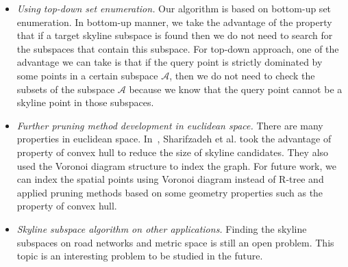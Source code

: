 \begin{itemize}
   
\item \textit{Using top-down set enumeration.} Our algorithm is based on bottom-up set enumeration. In bottom-up manner, we take the advantage of the property that if a target skyline subspace is found then we do not need to search for the subspaces that contain this subspace. For top-down approach, one of the advantage we can take is that if the query point is strictly dominated by some points in a certain subspace $\mathcal{A}$, then we do not need to check the subsets of the subspace $\mathcal{A}$ because we know that the query point cannot be a skyline point in those subspaces.

\item \textit{Further pruning method development in euclidean space.} There are many properties in euclidean space. In~\cite{sharifzadeh2006spatial}, Sharifzadeh et al. took the advantage of property of convex hull to reduce the size of skyline candidates. They also used the Voronoi diagram structure to index the graph. For future work, we can index the spatial points using Voronoi diagram instead of R-tree and applied pruning methods based on some geometry properties such as the property of convex hull.

\item \textit{Skyline subspace algorithm on other applications.} Finding the skyline subspaces on road networks and metric space is still an open problem. This topic is an interesting problem to be studied in the future.

\end{itemize}














